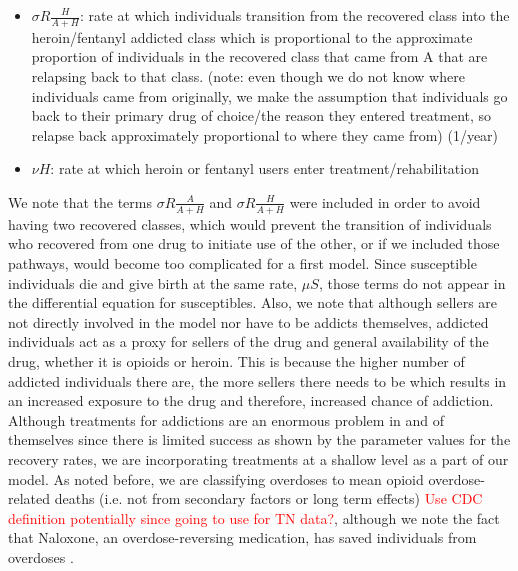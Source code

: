 \documentclass[12pt]{article}
\begin{document}
\begin{itemize}
\item $\sigma R \frac{H}{A+H}$: rate at which individuals transition from the recovered class into the heroin/fentanyl addicted class which is proportional to the approximate proportion of individuals in the recovered class that came from A that are relapsing back to that class. (note: even though we do not know where individuals came from originally, we make the assumption that individuals go back to their primary drug of choice/the reason they entered treatment, so relapse back approximately proportional to where they came from) (1/year)
\item $\nu H$: rate at which heroin or fentanyl users enter treatment/rehabilitation 
\end{itemize}
We note that the terms $\sigma R \frac{A}{A+H}$ and $\sigma R \frac{H}{A+H}$ were included in order to avoid having two recovered classes, which would prevent the transition of individuals who recovered from one drug to initiate use of the other, or if we included those pathways, would become too complicated for a first model. Since susceptible individuals die and give birth at the same rate, $\mu S$, those terms do not appear in the differential equation for susceptibles. Also, we note that although sellers are not directly involved in the model nor have to be addicts themselves, addicted individuals act as a proxy for sellers of the drug and general availability of the drug, whether it is opioids or heroin. This is because the higher number of addicted individuals there are, the more sellers there needs to be which results in an increased exposure to the drug and therefore, increased chance of addiction. Although treatments for addictions are an enormous problem in and of themselves since there is limited success as shown by the parameter values for the recovery rates, we are incorporating treatments at a shallow level as a part of our model. As noted before, we are classifying overdoses to mean opioid overdose-related deaths (i.e. not from secondary factors or long term effects) \textcolor{red}{Use CDC definition potentially since going to use for TN data?},
although we note the fact that Naloxone, an overdose-reversing medication, has saved individuals from overdoses \cite{NIDA2}. 
\end{document}

